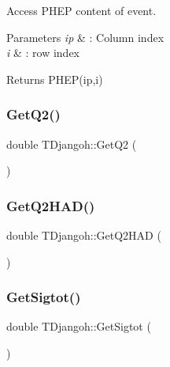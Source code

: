 Access P\+H\+EP content of event. 


\begin{DoxyParams}{Parameters}
{\em ip} & \+: Column index \\
\hline
{\em i} & \+: row index \\
\hline
\end{DoxyParams}
\begin{DoxyReturn}{Returns}
P\+H\+E\+P(ip,i) 
\end{DoxyReturn}
\mbox{\label{class_t_djangoh_afce6f0bfed90b20eb0f9310ae107291d}} 
\subsubsection{\texorpdfstring{Get\+Q2()}{GetQ2()}}
{\footnotesize\ttfamily double T\+Djangoh\+::\+Get\+Q2 (\begin{DoxyParamCaption}{ }\end{DoxyParamCaption})\hspace{0.3cm}{\ttfamily [inline]}}

\mbox{\label{class_t_djangoh_a969e748da53637a3732a27cfe23a34d2}} 
\subsubsection{\texorpdfstring{Get\+Q2\+H\+A\+D()}{GetQ2HAD()}}
{\footnotesize\ttfamily double T\+Djangoh\+::\+Get\+Q2\+H\+AD (\begin{DoxyParamCaption}{ }\end{DoxyParamCaption})\hspace{0.3cm}{\ttfamily [inline]}}

\mbox{\label{class_t_djangoh_a6c3ac520ed9c8c8eb0e80f3dda7eb146}} 
\subsubsection{\texorpdfstring{Get\+Sigtot()}{GetSigtot()}}
{\footnotesize\ttfamily double T\+Djangoh\+::\+Get\+Sigtot (\begin{DoxyParamCaption}{ }\end{DoxyParamCaption})}




